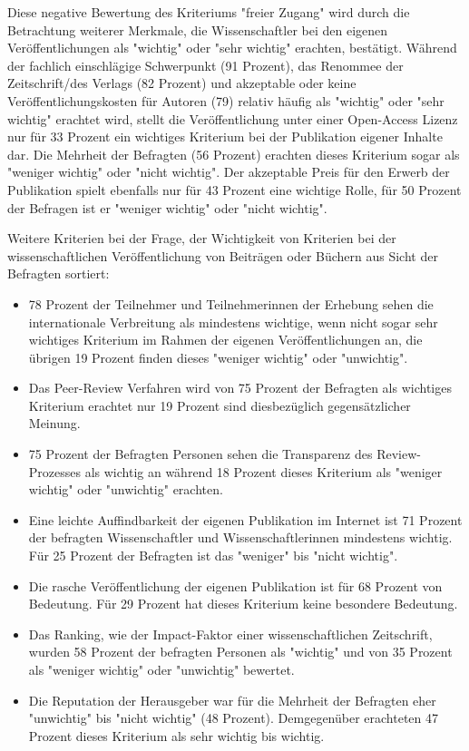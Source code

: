 Diese negative Bewertung des Kriteriums "freier Zugang" wird durch die Betrachtung weiterer Merkmale, die Wissenschaftler bei den eigenen Veröffentlichungen als "wichtig" oder "sehr wichtig" erachten, bestätigt. Während der fachlich einschlägige Schwerpunkt (91 Prozent), das Renommee der Zeitschrift/des Verlags (82 Prozent) und akzeptable oder keine Veröffentlichungskosten für Autoren (79) relativ häufig als "wichtig" oder "sehr wichtig" erachtet wird, stellt die Veröffentlichung unter einer Open-Access Lizenz nur für 33 Prozent ein wichtiges Kriterium bei der Publikation eigener Inhalte dar. Die Mehrheit der Befragten (56 Prozent) erachten dieses Kriterium sogar als "weniger wichtig" oder "nicht wichtig". Der akzeptable Preis für den Erwerb der Publikation spielt ebenfalls nur für 43 Prozent eine wichtige Rolle, für 50 Prozent der Befragen ist er "weniger wichtig" oder "nicht wichtig".

Weitere Kriterien bei der Frage, der Wichtigkeit von Kriterien bei der wissenschaftlichen Veröffentlichung von Beiträgen oder Büchern aus Sicht der Befragten sortiert:
\begin{itemize}
\item 78 Prozent der Teilnehmer und Teilnehmerinnen der Erhebung sehen die internationale Verbreitung als mindestens wichtige, wenn nicht sogar sehr wichtiges Kriterium im Rahmen der eigenen Veröffentlichungen an, die übrigen 19 Prozent finden dieses "weniger wichtig" oder "unwichtig".
\item Das Peer-Review Verfahren wird von 75 Prozent der Befragten als wichtiges Kriterium erachtet nur 19 Prozent sind diesbezüglich gegensätzlicher Meinung.
\item 75 Prozent der Befragten Personen sehen die Transparenz des Review-Prozesses als wichtig an während 18 Prozent dieses Kriterium als "weniger wichtig" oder "unwichtig" erachten.
\item Eine leichte Auffindbarkeit der eigenen Publikation im Internet ist 71 Prozent der befragten Wissenschaftler und Wissenschaftlerinnen mindestens wichtig. Für 25 Prozent der Befragten ist das "weniger" bis "nicht wichtig".
\item Die rasche Veröffentlichung der eigenen Publikation ist für 68 Prozent von Bedeutung. Für 29 Prozent hat dieses Kriterium keine besondere Bedeutung.
\item Das Ranking, wie der Impact-Faktor einer wissenschaftlichen Zeitschrift, wurden 58 Prozent der befragten Personen als "wichtig" und von 35 Prozent als "weniger wichtig" oder "unwichtig" bewertet.
\item Die Reputation der Herausgeber war für die Mehrheit der Befragten eher "unwichtig" bis "nicht wichtig" (48 Prozent). Demgegenüber erachteten 47 Prozent dieses Kriterium als sehr wichtig bis wichtig.
\end{itemize}


